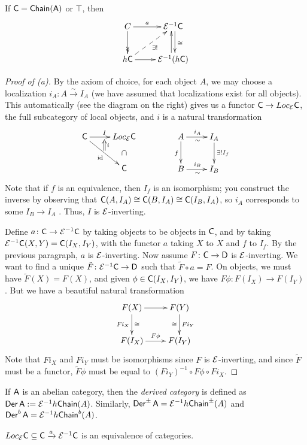 \begin{lemma}
 If $\text{\sf C}=\text{\sf Chain}(\text{\sf A})$ or $\top$, then
 \[\xymatrix{
  C\ar@{->>}[d] \ar[r]^-a & \E^{-1}\C \ar@<.5ex>[d]^\cong\\
  h\C\ar@{-->}[ur]_-{\exists !} \ar[r] & \E^{-1}(h\C)\ar@<.5ex>[u]
 }\]
\end{lemma}
\begin{proof}[Proof of (a)]
 By the axiom of choice, for each object $A$, we may choose a localization $i_A\colon A\xrightarrow\sim I_A$ (we have assumed that localizations exist for all objects). This automatically (see the diagram on the right) gives us a functor $\text{\sf C}\to Loc_{\mathcal{E}} \text{\sf C}$, the full subcategory of local objects, and $i$ is a natural transformation
 \[\xymatrix{
  \C\ar[r]^I_{}="b" \ar[dr]_\id^{}="a" & Loc_\E\C \ar@{}[d]|{\mbox{$\cap$}}\\
  & \C
  \ar@{=>}_i "a";"b"
 }\qquad\qquad
 \xymatrix{
  A\ar[r]^{i_A}_\sim\ar[d]_f & I_A\ar[d]^{\exists ! I_f}\\
  B\ar[r]^{i_B}_\sim & I_B
 }\]
 Note that if $f$ is an equivalence, then $I_f$ is an isomorphism; you construct the inverse by observing that $\text{\sf C}(A,I_A)\cong \text{\sf C}(B,I_A)\cong \text{\sf C}(I_B,I_A)$, so $i_A$ corresponds to some $I_B\to I_A$ . Thus, $I$ is $\mathcal{E}$-inverting.
 
 Define $a\colon \text{\sf C}\to \mathcal{E}^{-1}\text{\sf C}$ by taking objects to be objects in $\text{\sf C}$, and by taking $\mathcal{E}^{-1}\text{\sf C}(X,Y)=\text{\sf C}(I_X,I_Y)$, with the functor $a$ taking $X$ to $X$ and $f$ to $I_f$. By the previous paragraph, $a$ is $\mathcal{E}$-inverting. Now assume $F\colon \text{\sf C}\to \text{\sf D}$ is $\mathcal{E}$-inverting. We want to find a unique $\tilde F\colon \mathcal{E}^{-1}\text{\sf C}\to \text{\sf D}$ such that $\tilde F \circ a=F$. On objects, we must have $\tilde F(X)=F(X)$, and given $\phi\in \text{\sf C}(I_X,I_Y)$, we have $F\phi\colon F(I_X)\to F(I_Y)$. But we have a beautiful natural transformation
 \[\xymatrix{
  F(X)\ar[r]\ar[d]_{Fi_X}^\cong & F(Y)\ar[d]_\cong^{Fi_Y}\\
  F(I_X)\ar[r]^{F\phi} & F(I_Y)
 }\]
 Note that $Fi_X$ and $Fi_Y$ must be isomorphisms since $F$ is $\mathcal{E}$-inverting, and since $\tilde F$ must be a functor, $\tilde F\phi$ must be equal to $(Fi_Y)^{-1} \circ F\phi\circ Fi_X$.
\end{proof}
\begin{remark}[Notation]
 If $\text{\sf A}$ is an abelian category, then the \emph{derived category} is defined as $\operatorname{\sf Der} \text{\sf A}:= \mathcal{E}^{-1} h\text{\sf Chain}(A)$. Similarly, $\operatorname{\sf Der}^{\pm}\text{\sf A}=\mathcal{E}^{-1} h\text{\sf Chain}^{\pm}(A)$ and $\operatorname{\sf Der}^b\text{\sf A}=\mathcal{E}^{-1} h\text{\sf Chain}^{b}(A)$.
\end{remark}
\begin{lemma}
 $Loc_{\mathcal{E}} \text{\sf C}\subseteq \text{\sf C}\xrightarrow a \mathcal{E}^{-1}\text{\sf C}$ is an equivalence of categories.
\end{lemma}
